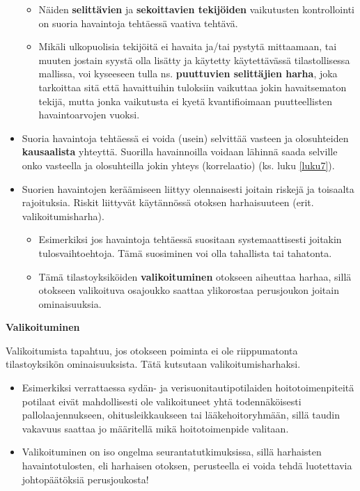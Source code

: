 \documentclass[
]{book}
\providecommand{\tightlist}{%
  \setlength{\itemsep}{0pt}\setlength{\parskip}{0pt}}
\begin{document}
\begin{itemize}
  \begin{itemize}
  \tightlist
  \item
    Näiden \textbf{selittävien} ja \textbf{sekoittavien tekijöiden} vaikutusten kontrollointi on suoria havaintoja tehtäessä vaativa tehtävä.
  \item
    Mikäli ulkopuolisia tekijöitä ei havaita ja/tai pystytä mittaamaan, tai muuten jostain syystä olla lisätty ja käytetty käytettävässä tilastollisessa mallissa, voi kyseeseen tulla ns. \textbf{puuttuvien selittäjien harha}, joka tarkoittaa sitä että havaittuihin tuloksiin vaikuttaa jokin havaitsematon tekijä, mutta jonka vaikutusta ei kyetä kvantifioimaan puutteellisten havaintoarvojen vuoksi.
  \end{itemize}
\item
  Suoria havaintoja tehtäessä ei voida (usein) selvittää vasteen ja olosuhteiden \textbf{kausaalista} yhteyttä. Suorilla havainnoilla voidaan lähinnä saada selville onko vasteella ja olosuhteilla jokin yhteys (korrelaatio) (ks. luku \ref{luku7}).
\item
  Suorien havaintojen keräämiseen liittyy olennaisesti joitain riskejä ja toisaalta rajoituksia. Riskit liittyvät käytännössä otoksen harhaisuuteen (erit. valikoitumisharha).

  \begin{itemize}
  \tightlist
  \item
    Esimerkiksi jos havaintoja tehtäessä suositaan systemaattisesti joitakin tulosvaihtoehtoja. Tämä suosiminen voi olla tahallista tai tahatonta.
  \item
    Tämä tilastoyksiköiden \textbf{valikoituminen} otokseen aiheuttaa harhaa, sillä otokseen valikoituva osajoukko saattaa ylikorostaa perusjoukon joitain ominaisuuksia.
  \end{itemize}
\end{itemize}

\begin{defblock}{}

\textbf{Valikoituminen}

Valikoitumista tapahtuu, jos otokseen poiminta ei ole riippumatonta tilastoyksikön ominaisuuksista. Tätä kutsutaan valikoitumisharhaksi.

\begin{itemize}
\item
  Esimerkiksi verrattaessa sydän- ja verisuonitautipotilaiden hoitotoimenpiteitä potilaat eivät mahdollisesti ole valikoituneet yhtä todennäköisesti pallolaajennukseen, ohitusleikkaukseen tai lääkehoitoryhmään, sillä taudin vakavuus saattaa jo määritellä mikä hoitotoimenpide valitaan.
\item
  Valikoituminen on iso ongelma seurantatutkimuksissa, sillä harhaisten havaintotulosten, eli harhaisen otoksen, perusteella ei voida tehdä luotettavia johtopäätöksiä perusjoukosta!
\end{itemize}

\end{defblock}
\end{document}
